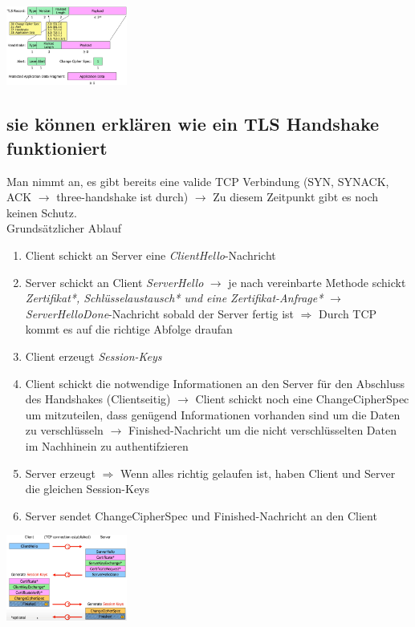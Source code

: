 \documentclass{report}
\newenvironment{Figure}
	{\par\medskip\noindent\minipage{\linewidth}}
	{\endminipage\par\medskip}
\theoremstyle{definition}
\theoremstyle{example}
\begin{document}
\begin{Figure}
\centering
\includegraphics[width=150px]{img/TLSMessageFormats.png}
	\label{fig:Abbildung der verschiedenen Formatmöglichkeiten}
\end{Figure}

	\subsection{sie können erklären wie ein TLS Handshake funktioniert}
Man nimmt an, es gibt bereits eine valide TCP Verbindung (SYN, SYNACK, ACK $\rightarrow$ three-handshake ist durch) $\rightarrow$ Zu diesem Zeitpunkt gibt es noch keinen Schutz.\\

Grundsätzlicher Ablauf
\begin{enumerate}
	\item Client schickt an Server eine \textit{ClientHello}-Nachricht
	\item Server schickt an Client \textit{ServerHello} $\rightarrow$ je nach vereinbarte Methode schickt \textit{Zertifikat*, Schlüsselaustausch* und eine Zertifikat-Anfrage*} $\rightarrow$ \textit{ServerHelloDone}-Nachricht sobald der Server fertig ist $\Rightarrow$ Durch TCP kommt es auf die richtige Abfolge draufan
	\item Client erzeugt \textit{Session-Keys}
	\item Client schickt die notwendige Informationen an den Server für den Abschluss des Handshakes (Clientseitig) $\rightarrow$ Client schickt noch eine ChangeCipherSpec um mitzuteilen, dass genügend Informationen vorhanden sind um die Daten zu verschlüsseln $\rightarrow$ Finished-Nachricht um die nicht verschlüsselten Daten im Nachhinein zu authentifzieren
	\item Server erzeugt  $\Rightarrow$ Wenn alles richtig gelaufen ist, haben Client und Server die gleichen Session-Keys
	\item Server sendet ChangeCipherSpec und Finished-Nachricht an den Client
\end{enumerate}
\begin{Figure}
\centering
\includegraphics[width=150px]{img/TLSHandshake.png}
	\label{fig:Abbildung des Ablaufs eines TLS Handshakes}
\end{Figure}
\end{document}

